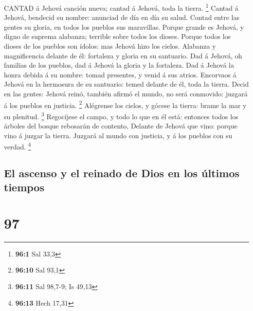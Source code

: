  CANTAD á Jehová canción nueva; cantad á Jehová, toda la
tierra. \footnote{\textbf{96:1} Sal 33,3}  Cantad á Jehová,
bendecid su nombre: anunciad de día en día su salud.  Contad
entre las gentes su gloria, en todos los pueblos sus maravillas.
 Porque grande es Jehová, y digno de suprema alabanza;
terrible sobre todos los dioses.  Porque todos los dioses de
los pueblos son ídolos: mas Jehová hizo los cielos. 
Alabanza y magnificencia delante de él: fortaleza y gloria en su
santuario.  Dad á Jehová, oh familias de los pueblos, dad á
Jehová la gloria y la fortaleza.  Dad á Jehová la honra
debida á su nombre: tomad presentes, y venid á sus atrios. 
Encorvaos á Jehová en la hermosura de su santuario: temed delante de él,
toda la tierra.  Decid en las gentes: Jehová reinó, también
afirmó el mundo, no será conmovido: juzgará á los pueblos en justicia.
\footnote{\textbf{96:10} Sal 93,1}  Alégrense los cielos, y
gócese la tierra: brame la mar y su plenitud. \footnote{\textbf{96:11}
  Sal 98,7-9; Is 49,13}  Regocíjese el campo, y todo lo que
en él está: entonces todos los árboles del bosque rebosarán de contento,
 Delante de Jehová que vino: porque vino á juzgar la
tierra. Juzgará al mundo con justicia, y á los pueblos con su verdad.
\footnote{\textbf{96:13} Hech 17,31}

\hypertarget{el-ascenso-y-el-reinado-de-dios-en-los-uxfaltimos-tiempos}{%
\subsection{El ascenso y el reinado de Dios en los últimos
tiempos}\label{el-ascenso-y-el-reinado-de-dios-en-los-uxfaltimos-tiempos}}

\hypertarget{section-96}{%
\section{97}\label{section-96}}

